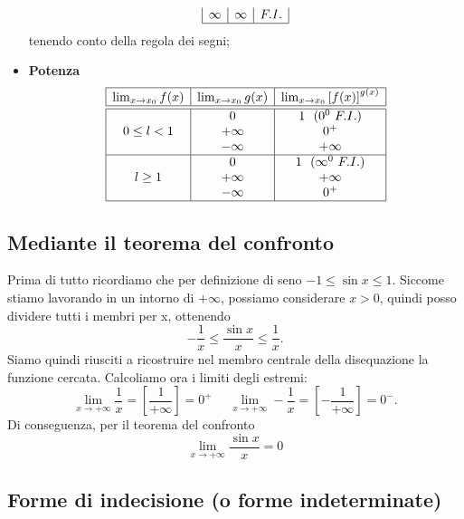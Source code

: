 \begin{shadedTheorem}
\begin{itemize}
\[\begin{array}{|c|c|c|}
                \infty & \infty & F. I. \\\hline
            \end{array}\]
            tenendo conto della regola dei segni;
            \item \textbf{Potenza}
            \[\begin{array}{|c|c|c|}
                \hline
                \lim_{x\to x_0}f(x)& \lim_{x\to x_0}g(x)& \lim_{x\to x_0}\left[ f(x) \right]^{g(x)} \\ \hline\hline
                            & 0         & 1  ~~(0^0~ F.I.)  \\
                0\leq l < 1 &  +\infty  & 0^+    \\
                            & -\infty   & +\infty    \\\hline
                            & 0         & 1 ~~(\infty^0~F.I.) \\
                l\geq 1     & +\infty   & +\infty     \\
                            & -\infty   & 0^+     \\\hline
            \end{array}\]
        \end{itemize}
\end{shadedTheorem}


\subsection{Mediante il teorema del confronto}

\begin{ex}
    Prima di tutto ricordiamo che per definizione di seno $-1\leq \sin x \leq 1$. Siccome stiamo lavorando in un intorno di $+\infty$, possiamo considerare $x>0$, quindi posso dividere tutti i membri per x, ottenendo \[-\frac{1}{x}\leq \frac{\sin x}{x}\leq \frac{1}{x}.\] Siamo quindi riusciti a ricostruire nel membro centrale della disequazione la funzione cercata. Calcoliamo ora i limiti degli estremi:
    \[\lim_{x\to +\infty}\frac{1}{x}=\left[\frac{1}{+\infty}\right]=0^+ ~~~~~~
    \lim_{x\to +\infty}-\frac{1}{x}=\left[-\frac{1}{+\infty}\right]=0^-.\]
    Di conseguenza, per il teorema del confronto \[\lim_{x\to + \infty} \frac{\sin x}{x}=0\]
\end{ex}

\subsection{Forme di indecisione (o forme indeterminate)}
